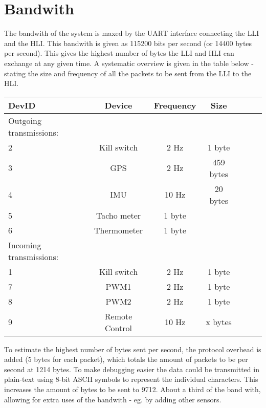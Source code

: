 \documentclass{article}
\begin{document}
\section{Bandwith}
The bandwith of the system is maxed by the UART interface connecting the LLI and the HLI. This bandwith is given as 115200 bits per second (or 14400 bytes per second). This gives the highest number of bytes the LLI and HLI can exchange at any given time. A systematic overview is given in the table below - stating the size and frequency of all the packets to be sent from the LLI to the HLI. 

\begin{tabular}{l*{5}{c}r}
DevID          & Device & Frequency & Size\\
\hline
Outgoing transmissions:\\
\hline
2 & Kill switch & 2 Hz & 1 byte\\
3 & GPS & 2 Hz & 459 bytes\\
4 & IMU & 10 Hz & 20 bytes\\
5 & Tacho meter & 1 byte\\
6 & Thermometer & 1 byte\\
\hline
Incoming transmissions:\\
\hline
1 & Kill switch & 2 Hz & 1 byte\\
7 & PWM1 & 2 Hz & 1 byte\\
8 & PWM2 & 2 Hz & 1 byte\\
9 & Remote Control & 10 Hz & x bytes\\
\end{tabular}

To estimate the highest number of bytes sent per second, the protocol overhead is added (5 bytes for each packet), which totals the amount of packets to be per second at 1214 bytes. To make debugging easier the data could be transmitted in plain-text using 8-bit ASCII symbols to represent the individual characters. This increases the amount of bytes to be sent to 9712. About a third of the band with, allowing for extra uses of the bandwith - eg. by adding other sensors. 
\end{document}
